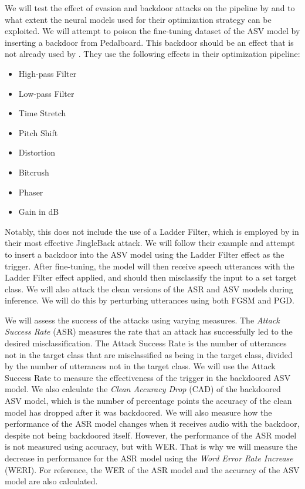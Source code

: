 \documentclass[11pt]{article}
\begin{document}
We will test the effect of evasion and backdoor attacks on the pipeline by \citeauthor{roddeman2024anonymization} and to what extent the neural models used for their optimization strategy can be exploited.
We will attempt to poison the fine-tuning dataset of the ASV model by inserting a backdoor from Pedalboard.
This backdoor should be an effect that is not already used by \citeauthor{roddeman2024anonymization}.
They use the following effects in their optimization pipeline:
\begin{itemize}
  \item High-pass Filter
  \item Low-pass Filter
  \item Time Stretch
  \item Pitch Shift
  \item Distortion
  \item Bitcrush
  \item Phaser
  \item Gain in dB
\end{itemize}
Notably, this does not include the use of a Ladder Filter, which is employed by \citet{stefanos2023jingleback} in their most effective JingleBack attack.
We will follow their example and attempt to insert a backdoor into the ASV model using the Ladder Filter effect as the trigger.
After fine-tuning, the model will then receive speech utterances with the Ladder Filter effect applied, and should then misclassify the input to a set target class.
We will also attack the clean versions of the ASR and ASV models during inference.
We will do this by perturbing utterances using both FGSM and PGD.

We will assess the success of the attacks using varying measures.
The \textit{Attack Success Rate} (ASR) measures the rate that an attack has successfully led to the desired misclassification.
The Attack Success Rate is the number of utterances not in the target class that are misclassified as being in the target class, divided by the number of utterances not in the target class.
We will use the Attack Success Rate to measure the effectiveness of the trigger in the backdoored ASV model.
We also calculate the \textit{Clean Accuracy Drop} (CAD) of the backdoored ASV model, which is the number of percentage points the accuracy of the clean model has dropped after it was backdoored.
We will also measure how the performance of the ASR model changes when it receives audio with the backdoor, despite not being backdoored itself.
However, the performance of the ASR model is not measured using accuracy, but with WER.
That is why we will measure the decrease in performance for the ASR model using the \textit{Word Error Rate Increase} (WERI).
For reference, the WER of the ASR model and the accuracy of the ASV model are also calculated.
\end{document}
